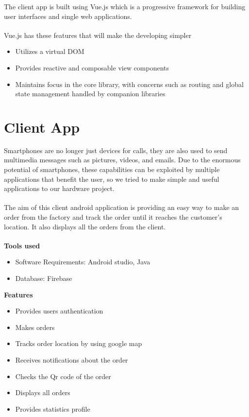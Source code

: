 The client app is built using Vue.js which is a progressive framework for building user interfaces and
single web applications.\\\\
Vue.js has these features that will make the developing simpler
\begin{itemize}
    \item Utilizes a virtual DOM
    \item Provides reactive and composable view components
    \item Maintains focus in the core library, with concerns such as routing and global state
    management handled by companion libraries
\end{itemize}


\section{Client App}

Smartphones are no longer just devices for calls, they are also used to send multimedia messages such
as pictures, videos, and emails. Due to the enormous potential of smartphones, these capabilities can
be exploited by multiple applications that benefit the user, so we tried to make simple and useful
applications to our hardware project.\\\\
The aim of this client android application is providing an easy way to make an order from the factory
and track the order until it reaches the customer's location. It also displays all the orders from the
client.\\\\

\textbf{Tools used}
\begin{itemize}
    \item Software Requirements: Android studio, Java
    \item Database: Firebase
\end{itemize}
\textbf{Features}
\begin{itemize}
    \item Provides users authentication
    \item Makes orders
    \item Tracks order location by using google map
    \item Receives notifications about the order
    \item Checks the Qr code of the order
    \item Displays all orders
    \item Provides statistics profile
\end{itemize}

